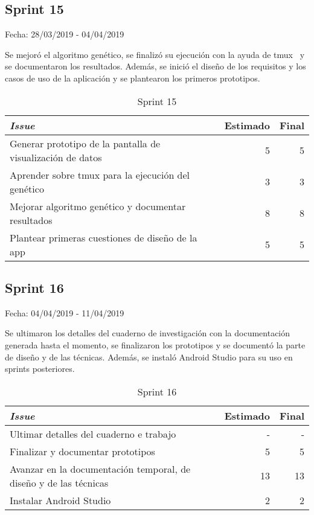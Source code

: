 \subsection{Sprint 15}

Fecha: 28/03/2019 - 04/04/2019

Se mejoró el algoritmo genético, se finalizó su ejecución con la ayuda de tmux~\cite{tmux} y se documentaron los resultados. Además, se inició el diseño de los requisitos y los casos de uso de la aplicación y se plantearon los primeros prototipos. 

\begin{table}[H]
	\begin{tabularx}{\textwidth}{Xrr}
		\toprule \textbf{\textit{Issue}} & \textbf{Estimado} & \textbf{Final}\\
		\toprule 
		Generar prototipo de la pantalla de visualización de datos & 5 & 5 \\
		Aprender sobre tmux para la ejecución del genético & 3 & 3 \\
		Mejorar algoritmo genético y documentar resultados & 8 & 8 \\
		Plantear primeras cuestiones de diseño de la app & 5 & 5 \\
		\bottomrule
	\end{tabularx}
	\caption{Sprint 15}
\end{table}

\subsection{Sprint 16}

Fecha: 04/04/2019 - 11/04/2019

Se ultimaron los detalles del cuaderno de investigación con la documentación generada hasta el momento, se finalizaron los prototipos y se documentó la parte de diseño y de las técnicas. Además, se instaló Android Studio para su uso en sprints posteriores. 


\begin{table}[H]
	\begin{tabularx}{\textwidth}{Xrr}
		\toprule \textbf{\textit{Issue}} & \textbf{Estimado} & \textbf{Final}\\
		\toprule
		Ultimar detalles del cuaderno e trabajo & - & - \\
		Finalizar y documentar prototipos & 5 & 5 \\
		Avanzar en la documentación temporal, de diseño y de las técnicas & 13 & 13 \\
		Instalar Android Studio & 2 & 2 \\
		\bottomrule
	\end{tabularx}
	\caption{Sprint 16}
\end{table}

